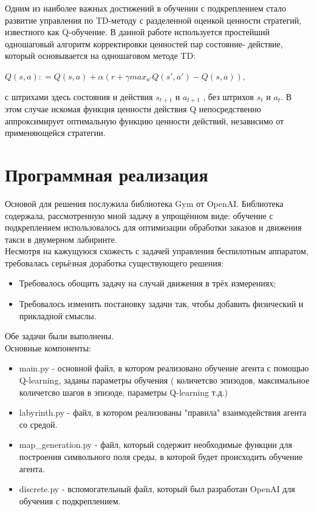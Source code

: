 \documentclass[12pt, a4paper]{report}
\theoremstyle{definition}
\theoremstyle{plain}
\theoremstyle{remark}
\theoremstyle{remark}
\theoremstyle{definition}
\begin{document}
Одним из наиболее важных достижений в обучении с подкреплением стало развитие управления по TD-методу с разделенной оценкой ценности
стратегий, известного как Q-обучение. В данной работе используется простейший одношаговый алгоритм корректировки ценностей пар состояние-
действие, который основывается на одношаговом методе TD:
\begin{center}
	$ Q(s, a): = Q(s, a) + \alpha(r + \gamma max_{a'} Q(s', a') - Q(s, a)), $
\end{center}
с штрихами здесь состояния и действия $ s_{t+1} $ и $ a_{t+1} $ , без штрихов $ s_{t} $ и $ a_{t} $. В этом случае искомая функция ценности действия Q непосредственно аппроксимирует оптимальную функцию ценности действий, независимо от применяющейся стратегии.

\section{Программная реализация}

Основой для решения послужила библиотека Gym от OpenAI. Библиотека содержала, рассмотренную мной задачу в упрощённом виде: обучение с подкреплением использовалось для оптимизации обработки заказов и движения такси в двумерном лабиринте.\\
Несмотря на кажущуюся схожесть с задачей управления беспилотным аппаратом, требовалась серьёзная доработка существующего решения:
\begin{itemize}
\item Требовалось обощить задачу на случай движения в трёх измерениях;
\item Требовалось изменить постановку задачи так, чтобы добавить физический и прикладной смыслы.
 \end{itemize}

Обе задачи были выполнены.\\ 

Основные компоненты:
\begin{itemize}
\item main.py - основной файл, в котором реализовано обучение агента с помощью Q-learning, заданы параметры обучения ( количетсво эпизодов, максимальное количетсво шагов в эпизоде, параметры Q-learning т.д.)
\item labyrinth.py - файл, в котором реализованы "правила" взаимодействия агента со средой.
\item map\_generation.py - файл, который содержит необходимые функции для построения символьного поля среды, в которой будет происходить обучение агента.
\item discrete.py - вспомогательный файл, который был разработан OpenAI для обучения с подкреплением.
 \end{itemize}
\end{document}
